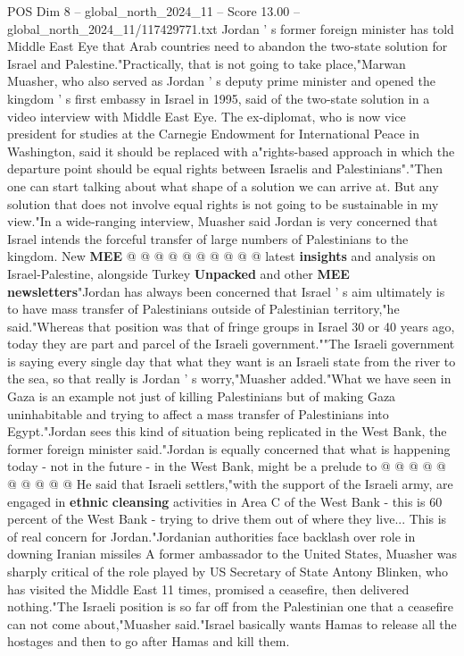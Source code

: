 \begin{textsample}{POS Dim 8 – global\_north\_2024\_11 – Score 13.00 – global\_north\_2024\_11/117429771.txt}  \label{ex:f8_pos_054}
Jordan ' s former foreign minister has told Middle East Eye that Arab countries need to abandon the two-state solution for Israel and Palestine."Practically, that is not going to take place,"Marwan Muasher, who also served as Jordan ' s deputy prime minister and opened the kingdom ' s first embassy in Israel in 1995, said of the two-state solution in a video interview with Middle East Eye.
The ex-diplomat, who is now vice president for studies at the Carnegie Endowment for International Peace in Washington, said it should be replaced with a"rights-based approach in which the departure point should be equal rights between Israelis and Palestinians"."Then one can start talking about what shape of a solution we can arrive at.
But any solution that does not involve equal rights is not going to be sustainable in my view."In a wide-ranging interview, Muasher said Jordan is very concerned that Israel intends the forceful transfer of large numbers of Palestinians to the kingdom.
New \textbf{MEE} @ @ @ @ @ @ @ @ @ @ latest \textbf{insights} and analysis on Israel-Palestine, alongside Turkey \textbf{Unpacked} and other \textbf{MEE} \textbf{newsletters}"Jordan has always been concerned that Israel ' s aim ultimately is to have mass transfer of Palestinians outside of Palestinian territory,"he said."Whereas that position was that of fringe groups in Israel 30 or 40 years ago, today they are part and parcel of the Israeli government.""The Israeli government is saying every single day that what they want is an Israeli state from the river to the sea, so that really is Jordan ' s worry,"Muasher added."What we have seen in Gaza is an example not just of killing Palestinians but of making Gaza uninhabitable and trying to affect a mass transfer of Palestinians into Egypt."Jordan sees this kind of situation being replicated in the West Bank, the former foreign minister said."Jordan is equally concerned that what is happening today - not in the future - in the West Bank, might be a prelude to @ @ @ @ @ @ @ @ @ @ He said that Israeli settlers,"with the support of the Israeli army, are engaged in \textbf{ethnic} \textbf{cleansing} activities in Area C of the West Bank - this is 60 percent of the West Bank - trying to drive them out of where they live...
This is of real concern for Jordan."Jordanian authorities face backlash over role in downing Iranian missiles A former ambassador to the United States, Muasher was sharply critical of the role played by US Secretary of State Antony Blinken, who has visited the Middle East 11 times, promised a ceasefire, then delivered nothing."The Israeli position is so far off from the Palestinian one that a ceasefire can not come about,"Muasher said."Israel basically wants Hamas to release all the hostages and then to go after Hamas and kill them.

\end{textsample}
